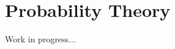 \documentclass[a4paper,11pt]{book}
\theoremstyle{plain}
\theoremstyle{definition}
\begin{document}
\chapter{Probability Theory}

Work in progress...
\end{document}
